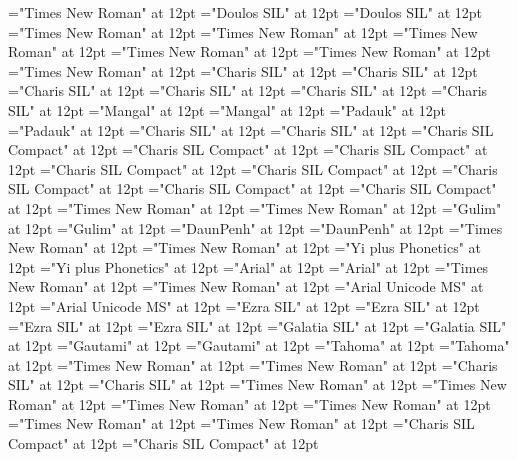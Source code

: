 \documentclass[a4paper,twoside]{article}
\begin{document}
\font\divqaaQMxperbk="Times New Roman" at 12pt
\font\spanqaafonipaxyii="Doulos SIL" at 12pt
\font\divqaafonipaxyii="Doulos SIL" at 12pt
\font\spanqaafonipaxperetic="Times New Roman" at 12pt
\font\divqaafonipaxperetic="Times New Roman" at 12pt
\font\spanpt="Times New Roman" at 12pt
\font\divpt="Times New Roman" at 12pt
\font\spanpis="Times New Roman" at 12pt
\font\divpis="Times New Roman" at 12pt
\font\spanpac="Charis SIL" at 12pt
\font\divpac="Charis SIL" at 12pt
\font\spanpacfonipa="Charis SIL" at 12pt
\font\divpacfonipa="Charis SIL" at 12pt
\font\spannko="Charis SIL" at 12pt
\font\divnko="Charis SIL" at 12pt
\font\spanne="Mangal" at 12pt
\font\divne="Mangal" at 12pt
\font\spanmy="Padauk" at 12pt
\font\divmy="Padauk" at 12pt
\font\spanms="Charis SIL" at 12pt
\font\divms="Charis SIL" at 12pt
\font\spanlmp="Charis SIL Compact" at 12pt
\font\divlmp="Charis SIL Compact" at 12pt
\font\spanlgr="Charis SIL Compact" at 12pt
\font\divlgr="Charis SIL Compact" at 12pt
\font\spanlgrSBfonipaxetic="Charis SIL Compact" at 12pt
\font\divlgrSBfonipaxetic="Charis SIL Compact" at 12pt
\font\spanlgrfonipa="Charis SIL Compact" at 12pt
\font\divlgrfonipa="Charis SIL Compact" at 12pt
\font\spanksk="Times New Roman" at 12pt
\font\divksk="Times New Roman" at 12pt
\font\spanko="Gulim" at 12pt
\font\divko="Gulim" at 12pt
\font\spankm="DaunPenh" at 12pt
\font\divkm="DaunPenh" at 12pt
\font\spankaw="Times New Roman" at 12pt
\font\divkaw="Times New Roman" at 12pt
\font\spanii="Yi plus Phonetics" at 12pt
\font\divii="Yi plus Phonetics" at 12pt
\font\spaniixpin="Arial" at 12pt
\font\diviixpin="Arial" at 12pt
\font\spanid="Times New Roman" at 12pt
\font\divid="Times New Roman" at 12pt
\font\spanhi="Arial Unicode MS" at 12pt
\font\divhi="Arial Unicode MS" at 12pt
\font\spanhe="Ezra SIL" at 12pt
\font\divhe="Ezra SIL" at 12pt
\font\spanhbo="Ezra SIL" at 12pt
\font\divhbo="Ezra SIL" at 12pt
\font\spangrc="Galatia SIL" at 12pt
\font\divgrc="Galatia SIL" at 12pt
\font\spanggoTeluIN="Gautami" at 12pt
\font\divggoTeluIN="Gautami" at 12pt
\font\spanggofonipaxemic="Tahoma" at 12pt
\font\divggofonipaxemic="Tahoma" at 12pt
\font\spanfr="Times New Roman" at 12pt
\font\divfr="Times New Roman" at 12pt
\font\spanfrZxxxxaudio="Charis SIL" at 12pt
\font\divfrZxxxxaudio="Charis SIL" at 12pt
\font\spanfa="Times New Roman" at 12pt
\font\divfa="Times New Roman" at 12pt
\font\spanes="Times New Roman" at 12pt
\font\dives="Times New Roman" at 12pt
\font\spanen="Times New Roman" at 12pt
\font\diven="Times New Roman" at 12pt
\font\spanenQaaaxtest="Charis SIL Compact" at 12pt
\font\divenQaaaxtest="Charis SIL Compact" at 12pt
\end{document}
